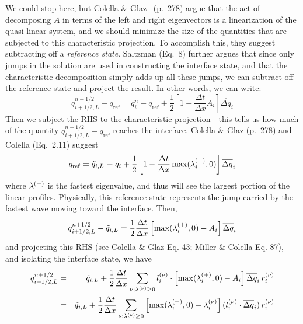 We could stop here, but Colella \& Glaz~\cite{colellaglaz:1985}
(p.\ 278) argue that the act of decomposing $A$ in terms of the left
and right eigenvectors is a linearization of the quasi-linear system,
and we should minimize the size of the quantities that are subjected
to this characteristic projection.  To accomplish this, they suggest
subtracting off a {\em reference state}.  Saltzman (Eq.\ 8) further
argues that since only jumps in the solution are used in constructing
the interface state, and that the characteristic decomposition simply adds
up all these jumps, we can subtract off the reference state and
project the result.  In other words, we can write:
\begin{equation}
q_{i+1/2,L}^{n+1/2} - q_\mathrm{ref} = q_i^n - q_\mathrm{ref} +  
  \frac{1}{2} \left [ 1 - \frac{\Delta t}{\Delta x} A_i \right ] \overline{\Delta q}_i
\label{eq:lin_decomp}
\end{equation}
Then we subject the RHS to the characteristic projection---this tells
us how much of the quantity $q_{i+1/2,L}^{n+1/2} - q_\mathrm{ref}$
reaches the interface.  Colella \& Glaz (p.\ 278) and Colella
(Eq.\ 2.11) suggest
\begin{equation}
q_\mathrm{ref} = \tilde{q}_{i,L} \equiv q_i + 
   \frac{1}{2} \left [ 1 - \frac{\Delta t}{\Delta x}
 \max(\lambda_i^{(+)}, 0) \right ] \overline{\Delta q}_i \label{eq:qref}
\end{equation}
where $\lambda^{(+)}$ is the fastest eigenvalue, and thus will see
the largest portion of the linear profiles.  Physically, this
reference state represents the jump carried by the fastest wave
moving toward the interface.  Then,
\begin{equation}
q_{i+1/2,L}^{n+1/2} - \tilde{q}_{i,L} = \frac{1}{2} \frac{\Delta t}{\Delta x}
  \left [ \max(\lambda_i^{(+)},0) - A_i \right ] \overline{\Delta q}_i
\end{equation}
and projecting this RHS (see Colella \& Glaz Eq. 43; Miller \& Colella Eq. 87),
and isolating the interface state, we have
\begin{eqnarray}
q_{i+1/2,L}^{n+1/2} &=& \tilde{q}_{i,L} + \frac{1}{2} \frac{\Delta t}{\Delta x}
       \sum_{\nu; \lambda^{(\nu)} \ge 0} l_i^{(\nu)} \cdot \left [ \max(\lambda_i^{(+)},0) - A_i \right ]
                                           \overline{\Delta q}_i \, r_i^{(\nu)} \\
                    &=& \tilde{q}_{i,L} + \frac{1}{2} \frac{\Delta t}{\Delta x}
       \sum_{\nu; \lambda^{(\nu)} \ge 0} \left [ \max(\lambda_i^{(+)},0) - \lambda_i^{(\nu)} \right ]
                                          (l_i^{(\nu)} \cdot \overline{\Delta q}_i) \, r_i^{(\nu)}
\end{eqnarray}
